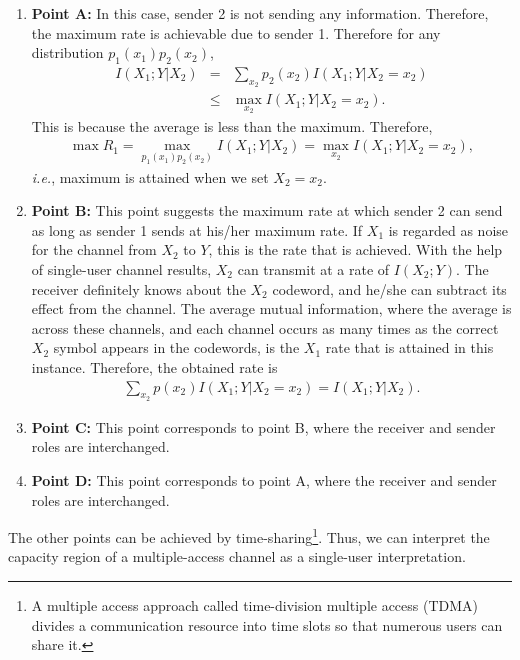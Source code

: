 \begin{enumerate}
    \item \textbf{Point A:} In this case, sender 2 is not sending any information. Therefore, the maximum rate is achievable due to sender 1. Therefore for any distribution $p_1(x_1)p_2(x_2)$,
    \begin{eqnarray}
        I(X_1;Y|X_2) &=& \sum_{x_2} p_2(x_2)I(X_1;Y|X_2=x_2) \\
        &\leq& \max_{x_2}  I(X_1;Y|X_2=x_2).
    \end{eqnarray}
    This is because the average is less than the maximum. Therefore,
    \begin{eqnarray}
        \max R_1 = \max_{p_1(x_1)p_2(x_2)}  I(X_1;Y|X_2)= \max_{x_2}  I(X_1;Y|X_2=x_2),
    \end{eqnarray}
    \textit{i.e.}, maximum is attained when we set $X_2 = x_2$.

    \item \textbf{Point B:} This point suggests the maximum rate at which sender 2 can send as long as sender 1 sends at his/her maximum rate. If $X_1$ is regarded as noise for the channel from $X_2$ to $Y$, this is the rate that is achieved. With the help of single-user channel results, $X_2$ can transmit at a rate of $I(X_2; Y)$. The receiver definitely knows about the $X_2$ codeword, and he/she can subtract its effect from the channel. The average mutual information, where the average is across these channels, and each channel occurs as many times as the correct $X_2$ symbol appears in the codewords, is the $X_1$ rate that is attained in this instance. Therefore, the obtained rate is
    \begin{eqnarray}
        \sum_{x_2} p(x_2)I(X_1;Y|X_2 = x_2) = I(X_1;Y|X_2).
    \end{eqnarray}

    \item \textbf{Point C:} This point corresponds to point B, where the receiver and sender roles are interchanged.

    \item \textbf{Point D:} This point corresponds to point A, where the receiver and sender roles are interchanged.
\end{enumerate}
%
The other points can be achieved by time-sharing\footnote{A multiple access approach called time-division multiple access (TDMA) divides a communication resource into time slots so that numerous users can share it.}. Thus, we can interpret the capacity region of a multiple-access channel as a single-user interpretation.
